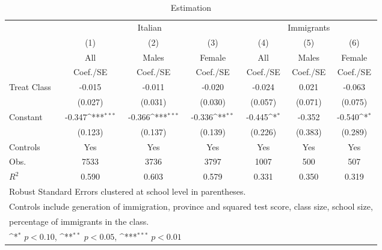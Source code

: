 \begin{table}[htbp]\centering
\def\sym#1{\ifmmode^{#1}\else\(^{#1}\)\fi}
\caption{Estimation \label{peer\_stdinvalsiIII}}
\begin{tabular}{l*{6}{c}}
\toprule
                    &\multicolumn{3}{c}{Italian}                                      &\multicolumn{3}{c}{Immigrants}                                   \\\cmidrule(lr){2-4}\cmidrule(lr){5-7}
                    &\multicolumn{1}{c}{(1)}&\multicolumn{1}{c}{(2)}&\multicolumn{1}{c}{(3)}&\multicolumn{1}{c}{(4)}&\multicolumn{1}{c}{(5)}&\multicolumn{1}{c}{(6)}\\
                    &\multicolumn{1}{c}{All}&\multicolumn{1}{c}{Males}&\multicolumn{1}{c}{Female}&\multicolumn{1}{c}{All}&\multicolumn{1}{c}{Males}&\multicolumn{1}{c}{Female}\\
                    &    Coef./SE         &    Coef./SE         &    Coef./SE         &    Coef./SE         &    Coef./SE         &    Coef./SE         \\
\midrule
Treat Class         &      -0.015         &      -0.011         &      -0.020         &      -0.024         &       0.021         &      -0.063         \\
                    &     (0.027)         &     (0.031)         &     (0.030)         &     (0.057)         &     (0.071)         &     (0.075)         \\
Constant            &      -0.347\sym{***}&      -0.366\sym{***}&      -0.336\sym{**} &      -0.445\sym{*}  &      -0.352         &      -0.540\sym{*}  \\
                    &     (0.123)         &     (0.137)         &     (0.139)         &     (0.226)         &     (0.383)         &     (0.289)         \\
Controls            &         Yes         &         Yes         &         Yes         &         Yes         &         Yes         &         Yes         \\
\midrule
Obs.                &        7533         &        3736         &        3797         &        1007         &         500         &         507         \\
\(R^{2}\)           &       0.590         &       0.603         &       0.579         &       0.331         &       0.350         &       0.319         \\
\bottomrule
\multicolumn{7}{l}{\footnotesize Robust Standard Errors clustered at school level in parentheses.}\\
\multicolumn{7}{l}{\footnotesize Controls include generation of immigration, province and squared test score, class size, school size,}\\
\multicolumn{7}{l}{\footnotesize percentage of immigrants in the class.}\\
\multicolumn{7}{l}{\footnotesize \sym{*} \(p<0.10\), \sym{**} \(p<0.05\), \sym{***} \(p<0.01\)}\\
\end{tabular}
\end{table}
